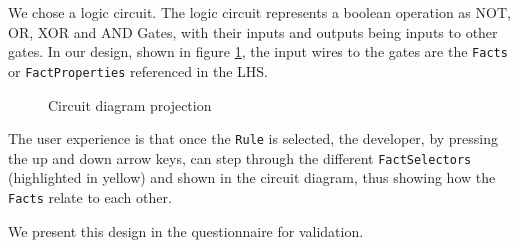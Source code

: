 We chose a logic circuit. 
The logic circuit represents a boolean operation as NOT, OR, XOR and AND Gates, with their inputs and outputs being inputs to other gates.
In our design, shown in figure \ref{fig:CircuitDiagramProjection}, the input wires to the gates are the \texttt{Facts} or \texttt{FactProperties} referenced in the LHS.

\begin{figure}[h]
    \centering
    \caption{Circuit diagram projection}
    \label{fig:CircuitDiagramProjection}
\end{figure}

The user experience is that once the \texttt{Rule} is selected, the developer, by pressing the up and down arrow keys, can step through the different \texttt{FactSelectors} (highlighted in yellow) and shown in the circuit diagram, thus showing how the \texttt{Facts} relate to each other.

We present this design in the questionnaire for validation.

